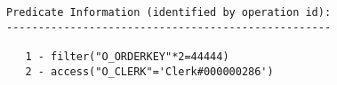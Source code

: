 \documentclass[11pt,a4paper,parskip=half]{scrartcl}
\begin{document}
\begin{lstlisting}
Predicate Information (identified by operation id):                                                                                                                                                                                                                                                          
---------------------------------------------------                                                                                                                                                                                                                                                          
                                                                                                                                                                                                                                                                                                             
   1 - filter("O_ORDERKEY"*2=44444)                                                                                                                                                                                                                                                                          
   2 - access("O_CLERK"='Clerk#000000286') 
\end{lstlisting}
\end{document}

